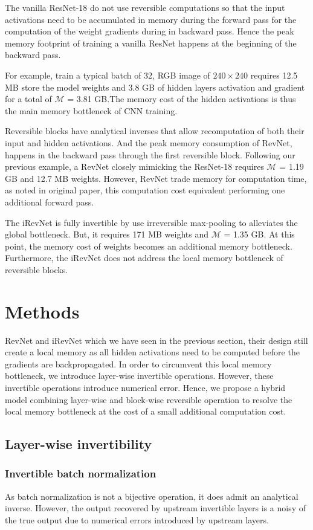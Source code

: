 \documentclass[10pt,twocolumn,letterpaper]{article}
\begin{document}
The vanilla ResNet-18 do not use reversible computations so that the input activations need to be accumulated in memory during the forward pass for the computation of the weight gradients during in backward pass. Hence the peak memory footprint of training a vanilla ResNet happens at the beginning of the backward pass.

For example, train a typical batch of 32, RGB image of $240 \times 240$ requires 12.5 MB  store the model weights and 3.8 GB of hidden layers activation and gradient for a total of  $\mathcal{M}$ = 3.81 GB.The memory cost of the hidden activations is thus the main memory bottleneck of CNN training. 
 
Reversible blocks have analytical inverses that allow recomputation of both their input and hidden activations. And the peak memory consumption of RevNet, happens in the backward pass through the first reversible block. Following our previous example, a RevNet closely mimicking the ResNet-18 requires $\mathcal{M}$ = 1.19 GB and 12.7 MB weights. However, RevNet trade memory for computation time, as noted in original paper, this computation cost equivalent performing one additional forward pass.

The iRevNet is fully invertible by use irreversible max-pooling to alleviates the global bottleneck. But, it requires 171 MB weights and $\mathcal{M}$ = 1.35 GB. At this point, the memory cost of weights becomes an additional memory bottleneck. Furthermore, the iRevNet does not address the local memory bottleneck of reversible blocks. 

\section{Methods} 
RevNet and iRevNet which we have seen in the previous section, their design still create a local memory as all hidden activations need to be computed before the gradients are backpropagated. In order to circumvent this local memory bottleneck, we introduce layer-wise invertible operations. However, these invertible operations introduce numerical error. Hence, we propose a hybrid model combining layer-wise and block-wise reversible operation to resolve the local memory bottleneck at the cost of a small additional computation cost.


\subsection{Layer-wise invertibility}
\subsubsection{Invertible batch normalization}
As batch normalization is not a bijective operation, it does admit an analytical inverse. However, the output recovered by upstream invertible layers is a noisy of the true output due to numerical errors introduced by upstream layers.
  
\end{document}
